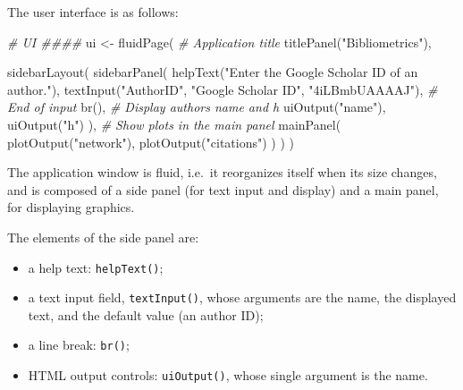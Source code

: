 \documentclass[
  12pt,
  american,
  a4paper,
  extrafontsizes,onecolumn,openright
  ]{memoir}
\newenvironment{Shaded}{\begin{snugshade}}{\end{snugshade}}
\newcommand{\CommentTok}[1]{\textcolor[rgb]{0.56,0.35,0.01}{\textit{#1}}}
\newcommand{\FunctionTok}[1]{\textcolor[rgb]{0.00,0.00,0.00}{#1}}
\newcommand{\NormalTok}[1]{#1}
\newcommand{\OtherTok}[1]{\textcolor[rgb]{0.56,0.35,0.01}{#1}}
\newcommand{\StringTok}[1]{\textcolor[rgb]{0.31,0.60,0.02}{#1}}
\providecommand{\tightlist}{%
  \setlength{\itemsep}{0pt}\setlength{\parskip}{0pt}}
\newlength{\rf}
\begin{document}
The user interface is as follows:

\scriptsize

\begin{Shaded}
\begin{Highlighting}[]
\CommentTok{\# UI \#\#\#\#}
\NormalTok{ui }\OtherTok{\textless{}{-}} \FunctionTok{fluidPage}\NormalTok{(}
  \CommentTok{\# Application title}
  \FunctionTok{titlePanel}\NormalTok{(}\StringTok{"Bibliometrics"}\NormalTok{),}
  
  \FunctionTok{sidebarLayout}\NormalTok{(}
    \FunctionTok{sidebarPanel}\NormalTok{(}
      \FunctionTok{helpText}\NormalTok{(}\StringTok{"Enter the Google Scholar ID of an author."}\NormalTok{),}
      \FunctionTok{textInput}\NormalTok{(}\StringTok{"AuthorID"}\NormalTok{, }\StringTok{"Google Scholar ID"}\NormalTok{, }\StringTok{"4iLBmbUAAAAJ"}\NormalTok{),}
      \CommentTok{\# End of input}
      \FunctionTok{br}\NormalTok{(),}
      \CommentTok{\# Display author\textquotesingle{}s name and h}
      \FunctionTok{uiOutput}\NormalTok{(}\StringTok{"name"}\NormalTok{),}
      \FunctionTok{uiOutput}\NormalTok{(}\StringTok{"h"}\NormalTok{)}
\NormalTok{    ),}
    \CommentTok{\# Show plots in the main panel}
    \FunctionTok{mainPanel}\NormalTok{(}
      \FunctionTok{plotOutput}\NormalTok{(}\StringTok{"network"}\NormalTok{),}
      \FunctionTok{plotOutput}\NormalTok{(}\StringTok{"citations"}\NormalTok{)}
\NormalTok{    )}
\NormalTok{  )}
\NormalTok{)}
\end{Highlighting}
\end{Shaded}

\normalsize

The application window is fluid, i.e.~it reorganizes itself when its size changes, and is composed of a side panel (for text input and display) and a main panel, for displaying graphics.

The elements of the side panel are:

\begin{itemize}
\tightlist
\item
  a help text: \texttt{helpText()};
\item
  a text input field, \texttt{textInput()}, whose arguments are the name, the displayed text, and the default value (an author ID);
\item
  a line break: \texttt{br()};
\item
  HTML output controls: \texttt{uiOutput()}, whose single argument is the name.
\end{itemize}
\end{document}
